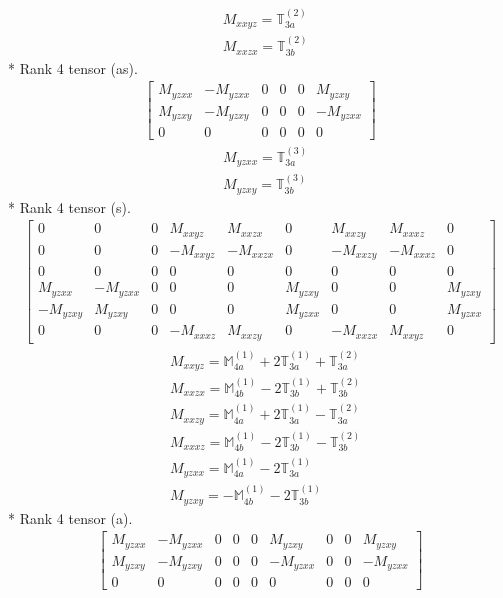 \documentclass[fleqn,8pt,landscape]{jsarticle}
\begin{document}
\begin{align*}
& M_{xxyz} = \mathbb{T}_{3a}^{(2)} \\
& M_{xxzx} = \mathbb{T}_{3b}^{(2)}
\end{align*}
* Rank 4 tensor (as).
\begin{align*}
\begin{bmatrix} M_{yzxx} & - M_{yzxx} & 0 & 0 & 0 & M_{yzxy} \\ M_{yzxy} & - M_{yzxy} & 0 & 0 & 0 & - M_{yzxx} \\ 0 & 0 & 0 & 0 & 0 & 0 \end{bmatrix}
\end{align*}
\begin{align*}
& M_{yzxx} = \mathbb{T}_{3a}^{(3)} \\
& M_{yzxy} = \mathbb{T}_{3b}^{(3)}
\end{align*}
* Rank 4 tensor (s).
\begin{align*}
\begin{bmatrix} 0 & 0 & 0 & M_{xxyz} & M_{xxzx} & 0 & M_{xxzy} & M_{xxxz} & 0 \\ 0 & 0 & 0 & - M_{xxyz} & - M_{xxzx} & 0 & - M_{xxzy} & - M_{xxxz} & 0 \\ 0 & 0 & 0 & 0 & 0 & 0 & 0 & 0 & 0 \\ M_{yzxx} & - M_{yzxx} & 0 & 0 & 0 & M_{yzxy} & 0 & 0 & M_{yzxy} \\ - M_{yzxy} & M_{yzxy} & 0 & 0 & 0 & M_{yzxx} & 0 & 0 & M_{yzxx} \\ 0 & 0 & 0 & - M_{xxxz} & M_{xxzy} & 0 & - M_{xxzx} & M_{xxyz} & 0 \end{bmatrix}
\end{align*}
\begin{align*}
& M_{xxyz} = \mathbb{M}_{4a}^{(1)} + 2 \mathbb{T}_{3a}^{(1)} + \mathbb{T}_{3a}^{(2)} \\
& M_{xxzx} = \mathbb{M}_{4b}^{(1)} - 2 \mathbb{T}_{3b}^{(1)} + \mathbb{T}_{3b}^{(2)} \\
& M_{xxzy} = \mathbb{M}_{4a}^{(1)} + 2 \mathbb{T}_{3a}^{(1)} - \mathbb{T}_{3a}^{(2)} \\
& M_{xxxz} = \mathbb{M}_{4b}^{(1)} - 2 \mathbb{T}_{3b}^{(1)} - \mathbb{T}_{3b}^{(2)} \\
& M_{yzxx} = \mathbb{M}_{4a}^{(1)} - 2 \mathbb{T}_{3a}^{(1)} \\
& M_{yzxy} = - \mathbb{M}_{4b}^{(1)} - 2 \mathbb{T}_{3b}^{(1)}
\end{align*}
* Rank 4 tensor (a).
\begin{align*}
\begin{bmatrix} M_{yzxx} & - M_{yzxx} & 0 & 0 & 0 & M_{yzxy} & 0 & 0 & M_{yzxy} \\ M_{yzxy} & - M_{yzxy} & 0 & 0 & 0 & - M_{yzxx} & 0 & 0 & - M_{yzxx} \\ 0 & 0 & 0 & 0 & 0 & 0 & 0 & 0 & 0 \end{bmatrix}
\end{align*}
\end{document}
